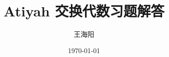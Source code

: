 \documentclass{article}
\begin{document}
\title{Atiyah 交换代数习题解答}
\author{王海阳}
\date{\today}
\maketitle

\tableofcontents








% 
% 
% 
\end{document}
